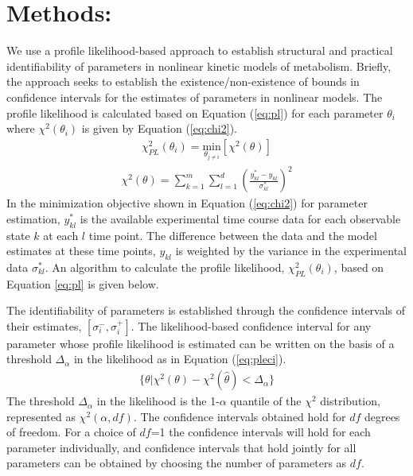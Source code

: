 \documentclass[10pt]{article}
\begin{document}
	\section{Methods:}
	 We use a profile likelihood-based approach \parencite{Raue2009a} to establish structural and practical identifiability of parameters in nonlinear kinetic models of metabolism. Briefly, the approach seeks to establish the existence/non-existence of bounds in confidence intervals for the estimates of parameters in nonlinear models. The profile likelihood is calculated based on Equation (\ref{eq:pl}) for each parameter $\theta_i$ where $\chi^2(\theta_i)$ is given by Equation (\ref{eq:chi2}).
	 \begin{align}\label{eq:pl}
	 \chi_{PL}^2(\theta_i) = \underset{\theta_{j\ne i}}{\mathrm{min}} \left[\chi^2(\theta)\right]
	 \end{align}
	 \begin{align}\label{eq:chi2}
	 \chi^2(\theta) = \sum_{k=1}^{m}\sum_{l=1}^{d}\left(\frac{y_{kl}^*-y_{kl}}{\sigma_{kl}^*}\right)^2
	 \end{align}
	 In the minimization objective shown in Equation (\ref{eq:chi2}) for parameter estimation, $y_{kl}^*$ is the available experimental time course data for each observable state $k$ at each $l$ time point. The difference between the data and the model estimates at these time points, $y_{kl}$ is weighted by the variance in the experimental data $\sigma_{kl}^*$. An algorithm to calculate the profile likelihood, $\chi_{PL}^2(\theta_i)$, based on Equation \ref{eq:pl} is given below.
	 
	 The identifiability of parameters is established through the confidence intervals of their estimates, $\left[\sigma_{i}^-,\sigma_{i}^+\right]$. The likelihood-based confidence interval for any parameter whose profile likelihood is estimated can be written on the basis of a threshold $\Delta_{\alpha}$ in the likelihood as in Equation (\ref{eq:pleci}).
	 \begin{align}\label{eq:pleci}
	 \{\theta|\chi^2(\theta)-\chi^2(\hat{\theta})<\Delta_{\alpha}\}
	 \end{align}
	 The threshold $\Delta_{\alpha}$ in the likelihood is the 1-$\alpha$ quantile of the $\chi^2$ distribution, represented as $\chi^2(\alpha,df)$. The confidence intervals obtained hold for $df$ degrees of freedom. For a choice of $df$=1 the confidence intervals will hold for each parameter individually, and confidence intervals that hold jointly for all parameters can be obtained by choosing the number of parameters as $df$. 
	
\end{document}
